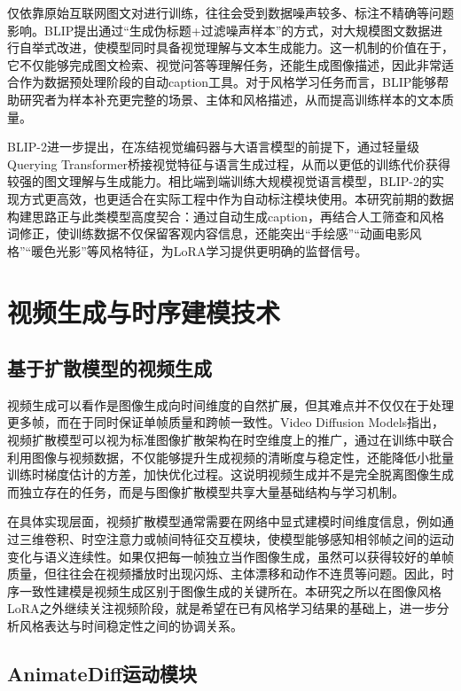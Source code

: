 仅依靠原始互联网图文对进行训练，往往会受到数据噪声较多、标注不精确等问题影响。BLIP\cite{ref32}提出通过“生成伪标题+过滤噪声样本”的方式，对大规模图文数据进行自举式改进，使模型同时具备视觉理解与文本生成能力。这一机制的价值在于，它不仅能够完成图文检索、视觉问答等理解任务，还能生成图像描述，因此非常适合作为数据预处理阶段的自动caption工具。对于风格学习任务而言，BLIP能够帮助研究者为样本补充更完整的场景、主体和风格描述，从而提高训练样本的文本质量。

BLIP-2\cite{ref33}进一步提出，在冻结视觉编码器与大语言模型的前提下，通过轻量级Querying Transformer桥接视觉特征与语言生成过程，从而以更低的训练代价获得较强的图文理解与生成能力。相比端到端训练大规模视觉语言模型，BLIP-2的实现方式更高效，也更适合在实际工程中作为自动标注模块使用。本研究前期的数据构建思路正与此类模型高度契合：通过自动生成caption，再结合人工筛查和风格词修正，使训练数据不仅保留客观内容信息，还能突出“手绘感”“动画电影风格”“暖色光影”等风格特征，为LoRA学习提供更明确的监督信号。

\section{视频生成与时序建模技术}

\subsection{基于扩散模型的视频生成}

视频生成可以看作是图像生成向时间维度的自然扩展，但其难点并不仅仅在于处理更多帧，而在于同时保证单帧质量和跨帧一致性。Video Diffusion Models\cite{ref34}指出，视频扩散模型可以视为标准图像扩散架构在时空维度上的推广，通过在训练中联合利用图像与视频数据，不仅能够提升生成视频的清晰度与稳定性，还能降低小批量训练时梯度估计的方差，加快优化过程。这说明视频生成并不是完全脱离图像生成而独立存在的任务，而是与图像扩散模型共享大量基础结构与学习机制。

在具体实现层面，视频扩散模型通常需要在网络中显式建模时间维度信息，例如通过三维卷积、时空注意力或帧间特征交互模块，使模型能够感知相邻帧之间的运动变化与语义连续性\cite{ref34}。如果仅把每一帧独立当作图像生成，虽然可以获得较好的单帧质量，但往往会在视频播放时出现闪烁、主体漂移和动作不连贯等问题。因此，时序一致性建模是视频生成区别于图像生成的关键所在。本研究之所以在图像风格LoRA之外继续关注视频阶段，就是希望在已有风格学习结果的基础上，进一步分析风格表达与时间稳定性之间的协调关系。

\subsection{AnimateDiff运动模块}

